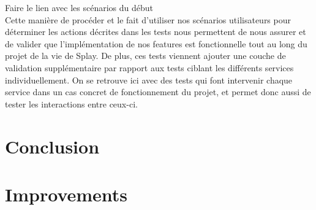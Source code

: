\documentclass{eplmastersthesis}
\begin{document}
      {\color{red} Faire le lien avec les scénarios du début}\\

      Cette manière de procéder et le fait d'utiliser nos scénarios utilisateurs
      pour déterminer les actions décrites dans les tests nous permettent de
      nous assurer et de valider que l'implémentation de nos features est
      fonctionnelle tout au long du projet de la vie de Splay. De plus, ces
      tests viennent ajouter une couche de validation supplémentaire par rapport
      aux tests ciblant les différents services individuellement. On se retrouve
      ici avec des tests qui font intervenir chaque service dans un cas concret
      de fonctionnement du projet, et permet donc aussi de tester les interactions
      entre ceux-ci.

  \chapter{Conclusion}

  \chapter{Improvements}


  \nocite{*}
  
  




  \backcoverpage
\end{document}
